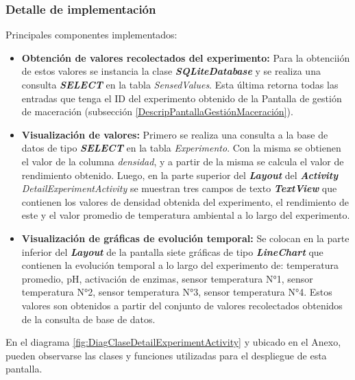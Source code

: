             \subsubsection{Detalle de implementación}
            \par Principales componentes implementados:
            \begin{itemize}
                \item \textbf{Obtención de valores recolectados del experimento:} Para la obtenciión de estos valores se instancia la clase \textbf{\textit{\gls{SQLiteDatabase}}} y se realiza una consulta \textbf{\textit{\gls{SELECT}}} en la tabla \textit{SensedValues}. Esta última retorna todas las entradas que tenga el ID del experimento obtenido de la Pantalla de gestión de maceración (subsección \ref{DescripPantallaGestiónMaceración}).
                
                \item \textbf{Visualización de valores:} Primero se realiza una consulta a la base de datos de tipo \textbf{\textit{\gls{SELECT}}} en la tabla \textit{Experimento}. Con la misma se obtienen el valor de la columna \textit{densidad}, y a partir de la misma se calcula el valor de rendimiento obtenido. Luego, en la parte superior del \textbf{\textit{\gls{Layout}}} del \textbf{\textit{\gls{Activity}}} \textit{DetailExperimentActivity} se muestran tres campos de texto \textbf{\textit{\gls{TextView}}} que contienen los valores de densidad obtenida del experimento, el rendimiento de este y el valor promedio de temperatura ambiental a lo largo del experimento.
                
                \item \textbf{Visualización de gráficas de evolución temporal:} Se colocan en la parte inferior del \textbf{\textit{\gls{Layout}}} de la pantalla siete gráficas de tipo \textbf{\textit{\gls{LineChart}}} que contienen la evolución temporal a lo largo del experimento de: temperatura promedio, pH, activación de enzimas, sensor temperatura N°1, sensor temperatura N°2, sensor temperatura N°3, sensor temperatura N°4. Estos valores son obtenidos a partir del conjunto de valores recolectados obtenidos de la consulta de base de datos.
            \end{itemize}
            
            \par En el diagrama \ref{fig:DiagClaseDetailExperimentActivity} y ubicado en el Anexo, pueden observarse las clases y funciones utilizadas para el despliegue de esta pantalla.
            
